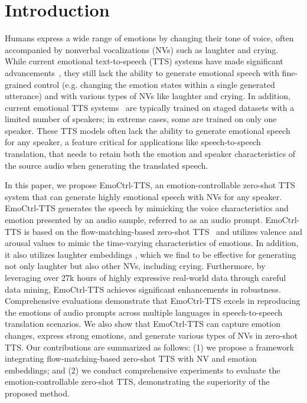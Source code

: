 
\section{Introduction}
\label{sec:intro}
\vspace{-.5em}

Humans express a wide range of emotions by changing their tone of voice, often accompanied by nonverbal vocalizations (NVs) such as laughter and crying. While current emotional text-to-speech (TTS) systems have made significant advancements~\cite{zhao2023emotion,tang2024ed,guo2023emodiff,tang2023emomix,zhou2022speech,tang2023qi,lei2022msemotts,shin2022text,lee2017emotional,li2021controllable,cai2021emotion,cho2024emosphere},
they still 
lack the ability to 
generate emotional speech with fine-grained control (e.g. changing the emotion states within a single generated utterance) and with various types of NVs like laughter and crying. 
In addition, current emotional TTS systems~\cite{zhao2023emotion,tang2024ed,guo2023emodiff,tang2023emomix,zhou2022speech,tang2023qi,lei2022msemotts,shin2022text,lee2017emotional,li2021controllable,cai2021emotion,cho2024emosphere} are typically trained on staged datasets with a limited number of speakers; in extreme cases, some are trained on only one speaker. 
These TTS models often lack the ability to generate emotional speech for any speaker, a feature critical for applications like speech-to-speech translation, that needs to retain both the emotion and speaker characteristics of the source audio when generating the translated speech.

In this paper, we propose EmoCtrl-TTS, an emotion-controllable zero-shot TTS system that can generate highly emotional speech with NVs for any speaker. EmoCtrl-TTS generates the speech by mimicking the voice characteristics and emotion presented by an audio sample, referred to as an audio prompt.
EmoCtrl-TTS is based on the flow-matching-based zero-shot TTS~\cite{le2024voicebox} and utilizes valence and arousal values to mimic the time-varying characteristics of emotions.
In addition, it also utilizes laughter embeddings \cite{kanda2024making}, which we find to be effective for generating not only laughter but also other NVs, including crying. 
Furthermore, by leveraging over 27k hours of highly expressive real-world data through careful data mining, EmoCtrl-TTS achieves significant enhancements in robustness.
Comprehensive evaluations demonstrate that EmoCtrl-TTS excels in reproducing the emotions of audio prompts across multiple languages in speech-to-speech translation scenarios. 
We also show that EmoCtrl-TTS can capture emotion changes, express strong emotions, and generate various types of NVs in zero-shot TTS.
Our contributions are summarized as follows: (1) we propose a framework integrating flow-matching-based zero-shot TTS with NV and emotion embeddings; and (2) we conduct comprehensive experiments to evaluate the emotion-controllable zero-shot TTS, demonstrating the superiority of the proposed method.